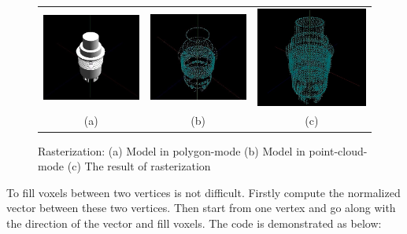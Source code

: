 \begin{figure}
\begin{center}
\begin{tabular}{ccc}   %
   \includegraphics[width=0.3\linewidth]{rasterization_demo1} & 
   \includegraphics[width=0.3\linewidth]{rasterization_demo2} &
   \includegraphics[width=0.3\linewidth]{rasterization_demo3} \\
   (a) & (b) & (c)\\
\end{tabular}
\caption{Rasterization: (a) Model in polygon-mode (b) Model in point-cloud-mode (c) The result of rasterization} 
  \label{rasterization_demo}
\end{center}
\end{figure}

To fill voxels between two vertices is not difficult. Firstly compute the normalized vector between these two vertices. Then start from one vertex and go along with the direction of the vector and fill voxels. The code is demonstrated as below:

\newpage

